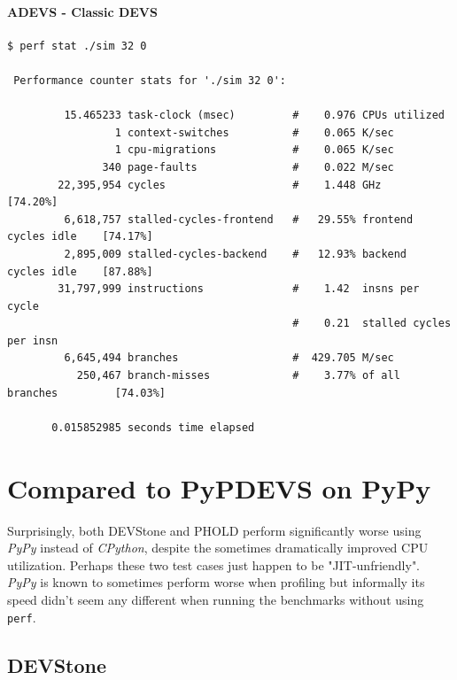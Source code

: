 \documentclass[8pt,a4paper]{report}
\begin{document}
\paragraph{\textsc{ADEVS} - Classic DEVS}
\begin{Verbatim}[fontsize=\small]
$ perf stat ./sim 32 0

 Performance counter stats for './sim 32 0':

         15.465233 task-clock (msec)         #    0.976 CPUs utilized          
                 1 context-switches          #    0.065 K/sec                  
                 1 cpu-migrations            #    0.065 K/sec                  
               340 page-faults               #    0.022 M/sec                  
        22,395,954 cycles                    #    1.448 GHz                     [74.20%]
         6,618,757 stalled-cycles-frontend   #   29.55% frontend cycles idle    [74.17%]
         2,895,009 stalled-cycles-backend    #   12.93% backend  cycles idle    [87.88%]
        31,797,999 instructions              #    1.42  insns per cycle        
                                             #    0.21  stalled cycles per insn
         6,645,494 branches                  #  429.705 M/sec                  
           250,467 branch-misses             #    3.77% of all branches         [74.03%]

       0.015852985 seconds time elapsed
\end{Verbatim}

\section{Compared to PyPDEVS on PyPy}
Surprisingly, both DEVStone and PHOLD perform significantly worse using \textit{PyPy} instead of \textit{CPython}, despite the sometimes dramatically improved CPU utilization. Perhaps these two test cases just happen to be "JIT-unfriendly".\\
\textit{PyPy} is known to sometimes perform worse when profiling but informally its speed didn't seem any different when running the benchmarks without using \texttt{perf}.

\subsection{DEVStone}
\end{document}
